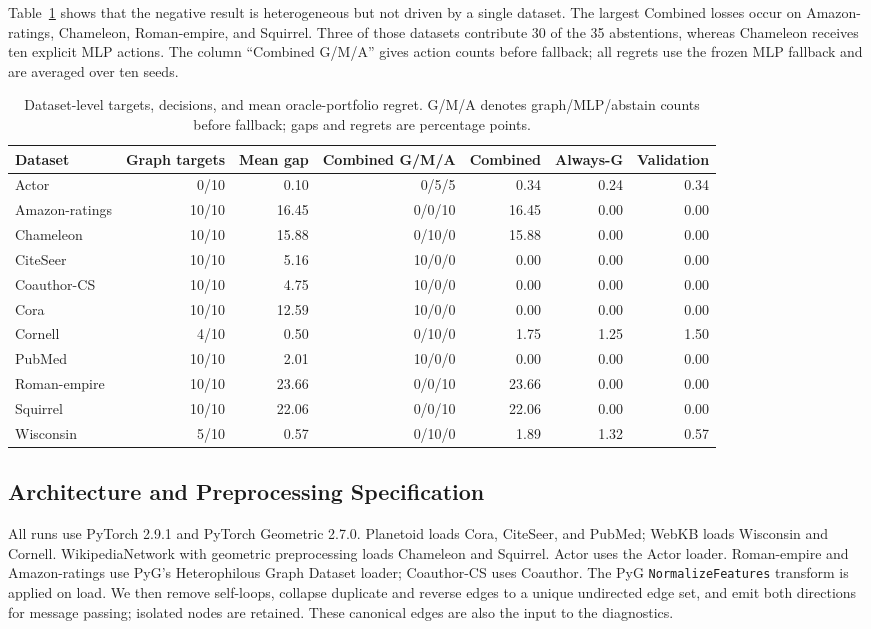 Table~\ref{tab:dataset_decisions} shows that the negative result is heterogeneous but not driven by a single dataset. The largest Combined losses occur on Amazon-ratings, Chameleon, Roman-empire, and Squirrel. Three of those datasets contribute 30 of the 35 abstentions, whereas Chameleon receives ten explicit MLP actions. The column ``Combined G/M/A'' gives action counts before fallback; all regrets use the frozen MLP fallback and are averaged over ten seeds.

\begin{table}[ht]
\centering
\caption{Dataset-level targets, decisions, and mean oracle-portfolio regret. G/M/A denotes graph/MLP/abstain counts before fallback; gaps and regrets are percentage points.}
\label{tab:dataset_decisions}
\scriptsize
\setlength{\tabcolsep}{3.0pt}
\begin{tabular}{@{}lrrrrrr@{}}
\toprule
Dataset & Graph targets & Mean gap & Combined G/M/A & Combined & Always-G & Validation \\
\midrule
Actor & 0/10 & 0.10 & 0/5/5 & 0.34 & 0.24 & 0.34 \\
Amazon-ratings & 10/10 & 16.45 & 0/0/10 & 16.45 & 0.00 & 0.00 \\
Chameleon & 10/10 & 15.88 & 0/10/0 & 15.88 & 0.00 & 0.00 \\
CiteSeer & 10/10 & 5.16 & 10/0/0 & 0.00 & 0.00 & 0.00 \\
Coauthor-CS & 10/10 & 4.75 & 10/0/0 & 0.00 & 0.00 & 0.00 \\
Cora & 10/10 & 12.59 & 10/0/0 & 0.00 & 0.00 & 0.00 \\
Cornell & 4/10 & 0.50 & 0/10/0 & 1.75 & 1.25 & 1.50 \\
PubMed & 10/10 & 2.01 & 10/0/0 & 0.00 & 0.00 & 0.00 \\
Roman-empire & 10/10 & 23.66 & 0/0/10 & 23.66 & 0.00 & 0.00 \\
Squirrel & 10/10 & 22.06 & 0/0/10 & 22.06 & 0.00 & 0.00 \\
Wisconsin & 5/10 & 0.57 & 0/10/0 & 1.89 & 1.32 & 0.57 \\
\bottomrule
\end{tabular}
\end{table}

\subsection{Architecture and Preprocessing Specification}

All runs use PyTorch 2.9.1 and PyTorch Geometric 2.7.0. Planetoid loads Cora, CiteSeer, and PubMed; WebKB loads Wisconsin and Cornell. WikipediaNetwork with geometric preprocessing loads Chameleon and Squirrel. Actor uses the Actor loader. Roman-empire and Amazon-ratings use PyG's Heterophilous Graph Dataset loader; Coauthor-CS uses Coauthor. The PyG \texttt{NormalizeFeatures} transform is applied on load. We then remove self-loops, collapse duplicate and reverse edges to a unique undirected edge set, and emit both directions for message passing; isolated nodes are retained. These canonical edges are also the input to the diagnostics.

